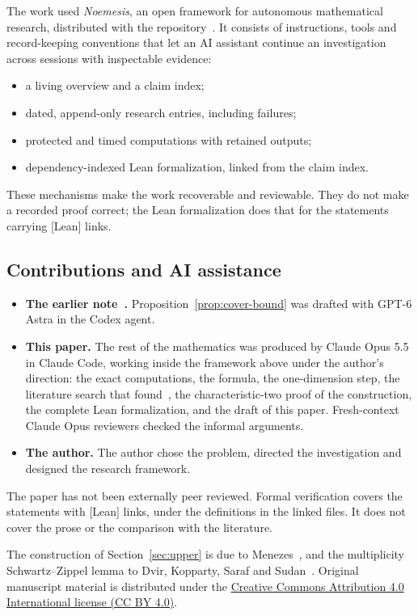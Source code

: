 The work used \emph{Noemesis}, an open framework for autonomous mathematical
research, distributed with the repository~\cite{Repo}. It consists of
instructions, tools and record-keeping conventions that let an AI assistant
continue an investigation across sessions with inspectable evidence:
\begin{itemize}
 \item a living overview and a claim index;
 \item dated, append-only research entries, including failures;
 \item protected and timed computations with retained outputs;
 \item dependency-indexed Lean formalization, linked from the claim index.
\end{itemize}
These mechanisms make the work recoverable and reviewable. They do not make a
recorded proof correct; the Lean formalization does that for the statements
carrying [Lean] links.

\subsection{Contributions and AI assistance}\label{sec:model-assistance}

\begin{itemize}
 \item \textbf{The earlier note~\cite{Note}.} Proposition~\ref{prop:cover-bound}
 was drafted with GPT-6 Astra in the Codex agent.
 \item \textbf{This paper.} The rest of the mathematics was produced by Claude
 Opus 5.5 in Claude Code, working inside the framework above under the
 author's direction: the exact computations, the formula, the one-dimension
 step, the literature search that found~\cite{Men26}, the characteristic-two
 proof of the construction, the complete Lean formalization, and the draft of
 this paper. Fresh-context Claude Opus reviewers checked the informal
 arguments.
 \item \textbf{The author.} The author chose the problem, directed the
 investigation and designed the research framework.
\end{itemize}
The paper has not been externally peer reviewed. Formal verification covers
the statements with [Lean] links, under the definitions in the linked files.
It does not cover the prose or the comparison with the literature.

The construction of Section~\ref{sec:upper} is due to Menezes~\cite{Men26}, and
the multiplicity Schwartz--Zippel lemma to Dvir, Kopparty, Saraf and
Sudan~\cite{DKSS13}. Original manuscript material is distributed under the
\href{https://creativecommons.org/licenses/by/4.0/}{Creative Commons Attribution
4.0 International license (CC BY 4.0)}.
